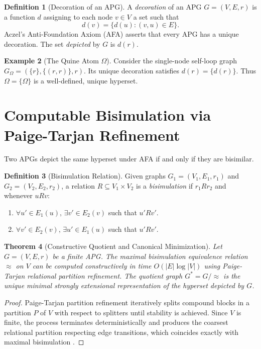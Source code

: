 \documentclass[11pt]{article}
\newtheorem{theorem}{Theorem}[section]
\theoremstyle{definition}
\newtheorem{definition}[theorem]{Definition}
\newtheorem{example}[theorem]{Example}
\begin{document}
\begin{definition}[Decoration of an APG]
A \emph{decoration} of an APG $G = (V, E, r)$ is a function $d$ assigning to each node $v \in V$ a set such that
\[
d(v) = \{d(u) : (v, u) \in E\}.
\]
Aczel's Anti-Foundation Axiom (AFA) asserts that every APG has a unique decoration. The set \emph{depicted} by $G$ is $d(r)$.
\end{definition}

\begin{example}[The Quine Atom $\Omega$]
Consider the single-node self-loop graph $G_\Omega = (\{r\}, \{(r, r)\}, r)$. Its unique decoration satisfies $d(r) = \{d(r)\}$. Thus $\Omega = \{\Omega\}$ is a well-defined, unique hyperset.
\end{example}

\section{Computable Bisimulation via Paige-Tarjan Refinement}
Two APGs depict the same hyperset under AFA if and only if they are bisimilar.

\begin{definition}[Bisimulation Relation]
Given graphs $G_1 = (V_1, E_1, r_1)$ and $G_2 = (V_2, E_2, r_2)$, a relation $R \subseteq V_1 \times V_2$ is a \emph{bisimulation} if $r_1 R r_2$ and whenever $u R v$:
\begin{enumerate}
\item $\forall u' \in E_1(u),\, \exists v' \in E_2(v)$ such that $u' R v'$.
\item $\forall v' \in E_2(v),\, \exists u' \in E_1(u)$ such that $u' R v'$.
\end{enumerate}
\end{definition}

\begin{theorem}[Constructive Quotient and Canonical Minimization]
Let $G = (V, E, r)$ be a finite APG. The maximal bisimulation equivalence relation $\approx$ on $V$ can be computed constructively in time $O(|E| \log |V|)$ using Paige-Tarjan relational partition refinement. The quotient graph $G^* = G / \approx$ is the unique minimal strongly extensional representation of the hyperset depicted by $G$.
\end{theorem}
\begin{proof}
Paige-Tarjan partition refinement iteratively splits compound blocks in a partition $P$ of $V$ with respect to splitters until stability is achieved. Since $V$ is finite, the process terminates deterministically and produces the coarsest relational partition respecting edge transitions, which coincides exactly with maximal bisimulation \cite{paige_tarjan}.
\end{proof}
\end{document}
